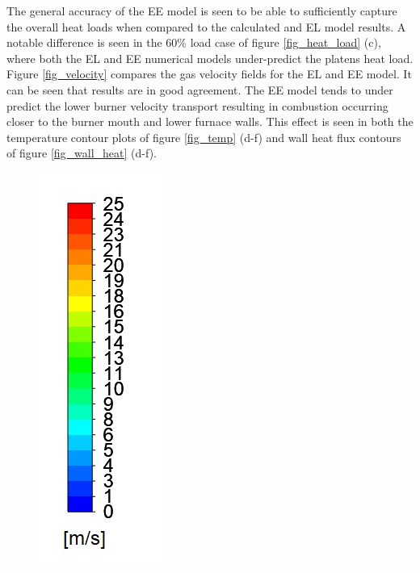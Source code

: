 \documentclass{webofc}
\begin{document}
The general accuracy of the EE model is seen to be able to sufficiently capture the overall heat loads when compared to the calculated and EL model results. A notable difference is seen in the 60\% load case of figure \ref{fig_heat_load} (c), where both the EL and EE numerical models under-predict the platens heat load. Figure \ref{fig_velocity} compares the gas velocity fields for the EL and EE model. It can be seen that results are in good agreement. The EE model tends to under predict the lower burner velocity transport resulting in combustion occurring closer to the burner mouth and lower furnace walls. This effect is seen in both the temperature contour plots of figure \ref{fig_temp} (d-f) and wall heat flux contours of figure \ref{fig_wall_heat} (d-f).
\begin{figure}[h!]
\centering
\includegraphics[scale = 0.3]{velo}

\end{figure}
\end{document}
